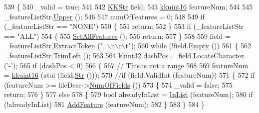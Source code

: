 \begin{DoxyCode}
539 \{
540   \_valid = \textcolor{keyword}{true};
541 
542   \hyperlink{class_k_k_b_1_1_k_k_str}{KKStr}     field;
543   \hyperlink{namespace_k_k_b_aa8c7d4d30381c8a0b6fce68974a9c8a9}{kkuint16}  featureNum;
544 
545   \_featureListStr.\hyperlink{class_k_k_b_1_1_k_k_str_a66ea0feabc94da88591b56a683695bd9}{Upper} ();
546 
547   numOfFeatures = 0;
548 
549   \textcolor{keywordflow}{if}  (\_featureListStr == \textcolor{stringliteral}{"NONE"})
550   \{
551     \textcolor{keywordflow}{return};
552   \}
553   \textcolor{keywordflow}{if}  (\_featureListStr == \textcolor{stringliteral}{"ALL"})
554   \{
555     \hyperlink{class_k_k_m_l_l_1_1_feature_num_list_acd048b5fee162160aa5dd9c8c5a06bb7}{SetAllFeatures} ();
556     \textcolor{keywordflow}{return};
557   \}
558 
559   field = \_featureListStr.\hyperlink{class_k_k_b_1_1_k_k_str_acc31c95308d6d699debde883c11e5802}{ExtractToken} (\textcolor{stringliteral}{", \(\backslash\)n\(\backslash\)r\(\backslash\)t"});
560   \textcolor{keywordflow}{while}  (!field.\hyperlink{class_k_k_b_1_1_k_k_str_ac69942f73fffd672ec2a6e1c410afdb6}{Empty} ())
561   \{
562     \_featureListStr.\hyperlink{class_k_k_b_1_1_k_k_str_af7c102c53103ddff3f48270b4a198c89}{TrimLeft} ();
563    
564     \hyperlink{namespace_k_k_b_a8fa4952cc84fda1de4bec1fbdd8d5b1b}{kkint32} dashPos = field.\hyperlink{class_k_k_b_1_1_k_k_str_ad738b238e609887bbf27841f359046cd}{LocateCharacter} (\textcolor{charliteral}{'-'});
565     \textcolor{keywordflow}{if}  (dashPos < 0)
566     \{
567       \textcolor{comment}{// This is not a range}
568 
569       featureNum = \hyperlink{namespace_k_k_b_aa8c7d4d30381c8a0b6fce68974a9c8a9}{kkuint16} (atoi (field.\hyperlink{class_k_k_b_1_1_k_k_str_ad574e6c0fe7f6ce1ba3ab0a8ce2fbd52}{Str} ()));
570       \textcolor{comment}{//if  (field.ValidInt (featureNum))}
571       \{
572         \textcolor{keywordflow}{if}  (featureNum >= fileDesc->\hyperlink{class_k_k_m_l_l_1_1_file_desc_a07abdfb77949dee565c555c7651581c2}{NumOfFields} ())
573         \{
574           \_valid = \textcolor{keyword}{false};
575           \textcolor{keywordflow}{return};
576         \}
577         \textcolor{keywordflow}{else}
578         \{
579           \textcolor{keywordtype}{bool}  alreadyInList = \hyperlink{class_k_k_m_l_l_1_1_feature_num_list_a9fd41e0a953af6698d2e47b35a328095}{InList} (featureNum);
580           \textcolor{keywordflow}{if}  (!alreadyInList)
581             \hyperlink{class_k_k_m_l_l_1_1_feature_num_list_a1d3b119854c90e602cab62ca46cd05cc}{AddFeature} (featureNum);
582         \}
583       \}
584     \}

\end{DoxyCode}
